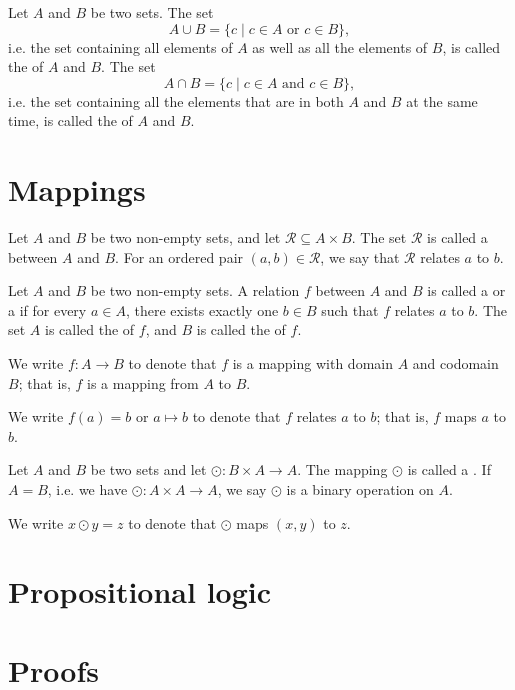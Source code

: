\begin{defn}
Let $ A $ and $ B $ be two sets. The set
\begin{equation*}
    A\cup B=\{c\mid c\in A\text{ or }c\in B\},
\end{equation*}
i.e. the set containing all elements of $ A $ as well as all the elements of $ B $, is called the  of $ A $ and $ B $. The set
\begin{equation*}
    A\cap B=\{c\mid c\in A\text{ and }c\in B\},
\end{equation*}
i.e. the set containing all the elements that are in both $ A $ and $ B $ at the same time, is called the  of $ A $ and $ B $.
\end{defn}

\section{Mappings}

\begin{defn}
Let $ A $ and $ B $ be two non-empty sets, and let $ \mathcal{R}\subseteq A\times B $. The set $ \mathcal{R} $ is called a  between $ A $ and $ B $. For an ordered pair $ (a,b)\in\mathcal{R} $, we say that $ \mathcal{R} $ relates $ a $ to $ b $.
\end{defn}

\begin{defn}
Let $ A $ and $ B $ be two non-empty sets. A relation $ f $ between $ A $ and $ B $ is called a  or a  if for every $ a\in A $, there exists exactly one $ b\in B $ such that $ f $ relates $ a $ to $ b $. The set $ A $ is called the  of $ f $, and $ B $ is called the  of $ f $.

We write $ f:A\to B $ to denote that $ f $ is a mapping with domain $ A $ and codomain $ B $; that is, $ f $ is a mapping from $ A $ to $ B $.

We write $ f(a)=b $ or $ a\mapsto b $ to denote that $ f $ relates $ a $ to $ b $; that is, $ f $ maps $ a $ to $ b $.
\end{defn}

\begin{defn}\label{defn:binop}
Let $ A $ and $ B $ be two sets and let $ \odot:B\times A\to A $. The mapping $ \odot $ is called a . If $ A=B $, i.e. we have $ \odot:A\times A\to A $, we say $ \odot $ is a binary operation on $ A $.

We write $ x\odot y=z $ to denote that $ \odot $ maps $ (x,y) $ to $ z $.
\end{defn}

\section{Propositional logic}

\section{Proofs}
